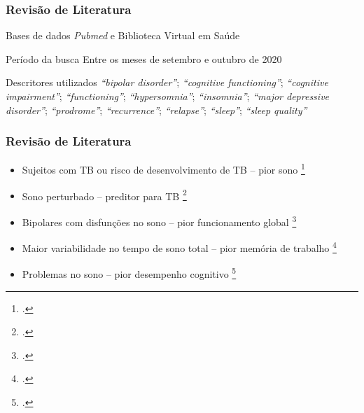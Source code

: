 \documentclass{beamer}
\begin{document}
\begin{frame}
    \frametitle{Revisão de Literatura}

    \begin{block}{Bases de dados}
        \emph{Pubmed} e Biblioteca Virtual em Saúde
    \end{block}

    \begin{block}{Período da busca}
        Entre os meses de setembro e outubro de 2020
    \end{block}

    \begin{block}{Descritores utilizados}
        \textit{``bipolar disorder''};
        \textit{``cognitive functioning''}; \textit{``cognitive impairment''};
        \textit{``functioning''}; \textit{``hypersomnia''};
        \textit{``insomnia''}; \textit{``major depressive disorder''};
        \textit{``prodrome''}; \textit{``recurrence''}; \textit{``relapse''};
        \textit{``sleep''}; \textit{``sleep quality''}
    \end{block}

    \centering

\end{frame}

\begin{frame}
\frametitle{Revisão de Literatura}

    \begin{itemize}

        \item Sujeitos com TB ou risco de desenvolvimento de TB -- pior sono
        \footcite{bradley_sleep_2017,
        slyepchenko_association_2019}

        \item Sono perturbado -- preditor para TB
        \footcite{ritter_disturbed_2015}

        \item Bipolares com disfunções no sono -- pior funcionamento global
        \footcite{giglio_sleep_2009}
        
        \item Maior variabilidade no tempo de sono total -- pior memória de trabalho 
        \footcite{kanady_association_2017}

        \item Problemas no sono -- pior desempenho cognitivo
        \footcite{russo_relationship_2015,
        kaplan_sleep_2020}

    \end{itemize}

\end{frame}
\end{document}
